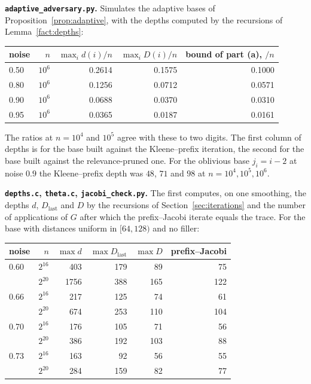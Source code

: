 \documentclass[11pt]{amsart}
\theoremstyle{definition}
\theoremstyle{remark}
\begin{document}
\medskip\noindent\textbf{\texttt{adaptive\_adversary.py}.} Simulates the adaptive bases of
Proposition~\ref{prop:adaptive}, with the depths computed by the recursions of
Lemma~\ref{fact:depths}:

\begin{center}
\begin{tabular}{lrrrr}
\toprule
noise & $n$ & $\max_id(i)/n$ & $\max_iD(i)/n$ & bound of part (a), $/n$\\
\midrule
0.50 & $10^6$ & 0.2614 & 0.1575 & 0.1000\\
0.80 & $10^6$ & 0.1256 & 0.0712 & 0.0571\\
0.90 & $10^6$ & 0.0688 & 0.0370 & 0.0310\\
0.95 & $10^6$ & 0.0365 & 0.0187 & 0.0161\\
\bottomrule
\end{tabular}
\end{center}

\noindent The ratios at $n=10^4$ and $10^5$ agree with these to two digits. The first column of
depths is for the base built against the Kleene--prefix iteration, the second for the base built
against the relevance-pruned one. For the oblivious base $j_i=i-2$ at noise $0.9$ the Kleene--prefix
depth was $48$, $71$ and $98$ at $n=10^4,10^5,10^6$.

\medskip\noindent\textbf{\texttt{depths.c}, \texttt{theta.c}, \texttt{jacobi\_check.py}.}
The first computes, on one smoothing, the depths $d$, $D_{\mathrm{last}}$ and $D$ by the recursions
of Section~\ref{sec:iterations} and the number of applications of $G$ after which the prefix--Jacobi iterate equals the
trace. For the base with distances uniform in $[64,128)$ and no filler:

\begin{center}
\begin{tabular}{lrrrrr}
\toprule
noise & $n$ & $\max d$ & $\max D_{\mathrm{last}}$ & $\max D$ & prefix--Jacobi\\
\midrule
0.60 & $2^{16}$ & 403 & 179 & 89 & 75\\
 & $2^{20}$ & 1756 & 388 & 165 & 122\\
0.66 & $2^{16}$ & 217 & 125 & 74 & 61\\
 & $2^{20}$ & 674 & 253 & 110 & 104\\
0.70 & $2^{16}$ & 176 & 105 & 71 & 56\\
 & $2^{20}$ & 386 & 192 & 103 & 88\\
0.73 & $2^{16}$ & 163 & 92 & 56 & 55\\
 & $2^{20}$ & 284 & 159 & 82 & 77\\
\bottomrule
\end{tabular}
\end{center}
\end{document}
